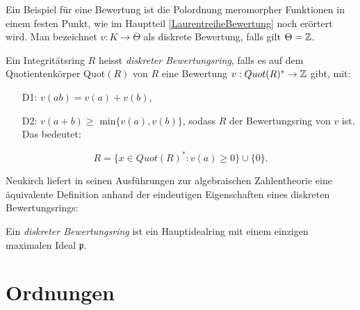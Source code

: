 Ein Beispiel für eine Bewertung ist die Polordnung meromorpher Funktionen in einem festen Punkt, wie im Hauptteil \ref*{LaurentreiheBewertung} noch erörtert wird. 
Man bezeichnet $v\colon K \to \overline{\Theta} $ als diskrete Bewertung, falls gilt ${\Theta} = \mathbb{Z}$.
%
\begin{defn} %
Ein Integritätsring $R$ heisst \textit{diskreter Bewertungsring}, falls es auf dem Quotientenkörper Quot$(R)$ von $R$ eine Bewertung $v: Quot(R)^* \rightarrow \mathbb{Z}$ gibt, mit:
\begin{enumerate}
\item[D1: ]$v(ab) = v(a)+ v(b)$, 
\item[D2: ] $v(a+b) \ge$ min$\lbrace v(a), v(b)\rbrace$,
sodass $R$ der Bewertungsring von $v$ ist. Das bedeutet:
\end{enumerate}
\[R = \lbrace x \in Quot(R)^*: v(a) \ge 0 \rbrace \cup \lbrace 0 \rbrace.\]
\end{defn}
Neukirch liefert in seinen Ausführungen zur algebraischen Zahlentheorie \cite[S. 126]{neukirch92} eine äquivalente Definition anhand der eindeutigen Eigenschaften eines diskreten Bewertungsrings:
\begin{defn} %
Ein \textit{diskreter Bewertungsring} ist ein Hauptidealring mit einem einzigen maximalen Ideal $\mathfrak{p}$.
\end{defn} 
%
%
\section{Ordnungen}
